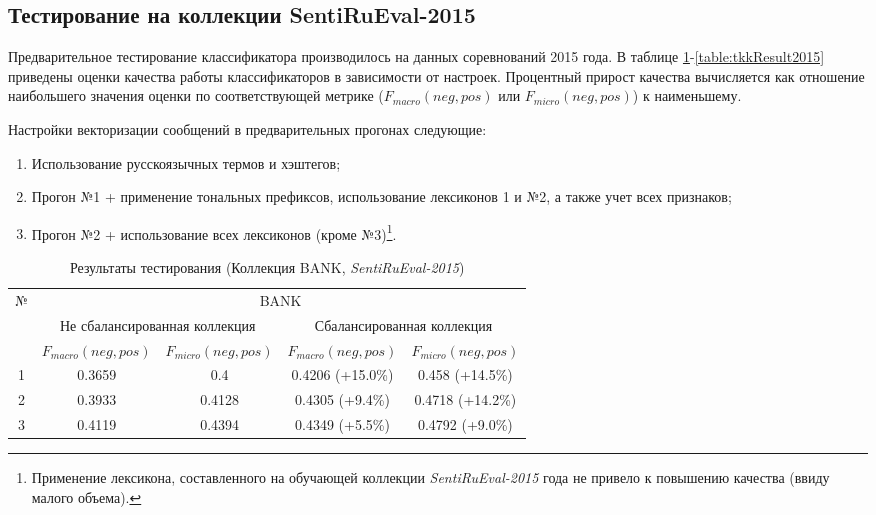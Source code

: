 \newpage
\subsection{Тестирование на коллекции SentiRuEval-2015}
\label{sec:test2015}
Предварительное тестирование классификатора производилось на данных
соревнований 2015 года.
В таблице \ref{table:bankResult2015}-\ref{table:tkkResult2015} приведены оценки
качества работы классификаторов в зависимости от настроек.
Процентный прирост качества вычисляется как отношение наибольшего значения оценки по
соответствующей метрике ($F_{macro}(neg, pos)$ или $F_{micro}(neg, pos)$) к
наименьшему.

Настройки векторизации сообщений в предварительных прогонах следующие:
\begin{enumerate}
    \item Использование русскоязычных термов и хэштегов;
    \item Прогон №1 + применение тональных префиксов, использование лексиконов 1
        и №2, а также учет всех признаков;
    \item Прогон №2 + использование всех лексиконов (кроме №3)\footnote{
        Применение лексикона, составленного на обучающей коллекции {\it SentiRuEval-2015}
        года не привело к повышению качества (ввиду малого объема).
    }.
\end{enumerate}

\begin{table}[ht!]
\centering
\caption{Результаты тестирования (Коллекция BANK, {\it SentiRuEval-2015})}
\label{table:bankResult2015}
\begin{tabular}{|c|c|c|c|c|}
\hline
\multirow{3}{*}{№} & \multicolumn{4}{c|}{BANK}                                                               \\ \cline{2-5}
                   & \multicolumn{2}{c|}{Не сбалансированная коллекция} & \multicolumn{2}{c|}{Сбалансированная коллекция} \\ \cline{2-5}
                   & $F_{macro}(neg, pos)$    & $F_{micro}(neg, pos)$   & $F_{macro}(neg, pos)$  & $F_{micro}(neg, pos)$  \\ \hline
1                  & 0.3659                   & 0.4                     & 0.4206 (+15.0\%)       & 0.458 (+14.5\%)        \\ \hline
2                  & 0.3933                   & 0.4128                  & 0.4305 (+9.4\%)        & 0.4718 (+14.2\%)       \\ \hline
3                  & 0.4119                   & 0.4394                  & 0.4349 (+5.5\%)        & 0.4792 (+9.0\%)        \\ \hline
\end{tabular}
\end{table}

